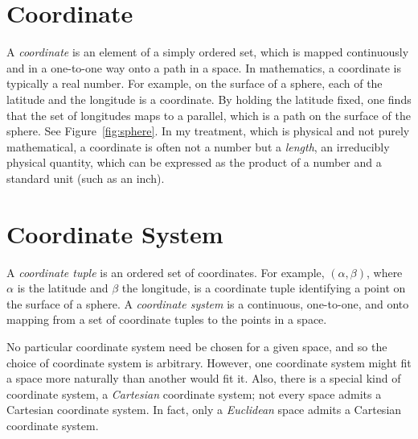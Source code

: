 \section{Coordinate}

A \emph{coordinate} is an element of a simply ordered set,
which is mapped continuously and in a one-to-one way onto a path in a
space.
In mathematics, a coordinate is typically a real number.  For example, on the
surface of a sphere, each of the latitude and the longitude is a coordinate.
By holding the latitude fixed, one finds that the set of longitudes maps to a
parallel, which is a path on the surface of the sphere.  See
Figure~\ref{fig:sphere}.  In my treatment, which is physical and not purely
mathematical, a coordinate is often not a number but a \emph{length}, an
irreducibly physical quantity, which can be expressed as the product of a
number and a standard unit (such as an inch).

\section{Coordinate System}

A \emph{coordinate tuple} is an ordered set of coordinates.  For example,
$(\alpha,\beta)$, where $\alpha$ is the latitude and $\beta$ the longitude, is
a coordinate tuple identifying a point on the surface of a sphere.  A
\emph{coordinate system} is a continuous, one-to-one, and onto mapping from a
set of coordinate tuples to the points in a space.

No particular coordinate system need be chosen for a given space, and so the
choice of coordinate system is arbitrary.  However, one coordinate system might
fit a space more naturally than another would fit it.  Also, there is a special
kind of coordinate system, a \emph{Cartesian} coordinate system; not every
space admits a Cartesian coordinate system.  In fact, only a \emph{Euclidean}
space admits a Cartesian coordinate system.

